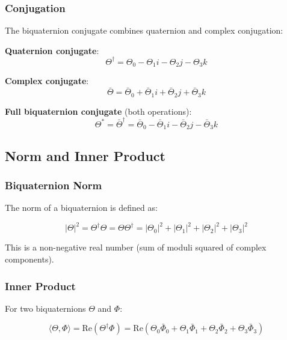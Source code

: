 \subsubsection{Conjugation}

The biquaternion conjugate combines quaternion and complex conjugation:

\textbf{Quaternion conjugate}:
\begin{equation}
\label{eq:canonical:quat_conj}
\Theta^\dagger = \Theta_0 - \Theta_1 i - \Theta_2 j - \Theta_3 k
\end{equation}

\textbf{Complex conjugate}:
\begin{equation}
\label{eq:canonical:complex_conj}
\bar{\Theta} = \bar{\Theta}_0 + \bar{\Theta}_1 i + \bar{\Theta}_2 j + \bar{\Theta}_3 k
\end{equation}

\textbf{Full biquaternion conjugate} (both operations):
\begin{equation}
\label{eq:canonical:biquat_conj}
\Theta^* = \bar{\Theta}^\dagger = \bar{\Theta}_0 - \bar{\Theta}_1 i - \bar{\Theta}_2 j - \bar{\Theta}_3 k
\end{equation}

\subsection{Norm and Inner Product}

\subsubsection{Biquaternion Norm}

The norm of a biquaternion is defined as:

\begin{equation}
\label{eq:canonical:biquat_norm}
|\Theta|^2 = \Theta^\dagger \Theta = \Theta \Theta^\dagger = |\Theta_0|^2 + |\Theta_1|^2 + |\Theta_2|^2 + |\Theta_3|^2
\end{equation}

This is a non-negative real number (sum of moduli squared of complex components).

\subsubsection{Inner Product}

For two biquaternions $\Theta$ and $\Phi$:

\begin{equation}
\label{eq:canonical:biquat_inner}
\langle \Theta, \Phi \rangle = \text{Re}(\Theta^\dagger \Phi) = \text{Re}(\Theta_0\bar{\Phi}_0 + \Theta_1\bar{\Phi}_1 + \Theta_2\bar{\Phi}_2 + \Theta_3\bar{\Phi}_3)
\end{equation}

